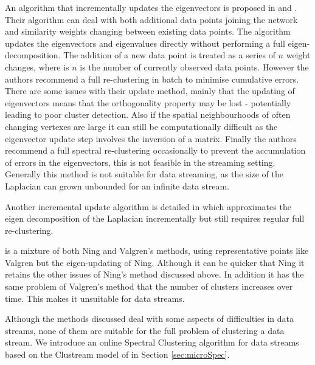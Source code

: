 An algorithm that incrementally updates the eigenvectors is proposed in \cite{Ning2007} and  \cite{Ning2010}. Their algorithm can deal with both additional data points joining the network and similarity weights changing between existing data points. The algorithm updates the eigenvectors and eigenvalues directly without performing a full eigen-decomposition. The addition of a new data point is treated as a series of $n$ weight changes, where is $n$ is the number of currently observed data points.  However the authors recommend a full re-clustering in batch to minimise cumulative errors. There are some issues with their update method, mainly that the updating of eigenvectors means that the orthogonality property may be lost - potentially leading to poor cluster detection. Also if the spatial neighbourhoods of often changing vertexes are large it can still be computationally difficult as the eigenvector update step involves the inversion of a matrix. Finally the authors recommend a full spectral re-clustering occasionally to prevent the accumulation of errors in the eigenvectors, this is not feasible in the streaming setting. Generally this method is not suitable for data streaming, as the size of the Laplacian can grown unbounded for an infinite data stream. %

Another incremental update algorithm is detailed in \cite{Dhanjal2014} which approximates the eigen decomposition of the Laplacian incrementally but still requires regular full re-clustering. %

\cite{Kong2011} is a mixture of both Ning and Valgren's methods, using representative points like Valgren but the eigen-updating of Ning. Although it can be quicker that Ning it retains the other issues of Ning's method discussed above. In addition it has the same problem of Valgren's method that the number of clusters increases over time. This makes it unsuitable for data streams. %


Although the methods discussed deal with some aspects of difficulties in data streams, none of them are suitable for the full problem of clustering a data stream. We introduce an online Spectral Clustering algorithm for data streams based on the Clustream model of \cite{Aggarwal2003} in Section \ref{sec:microSpec}.


